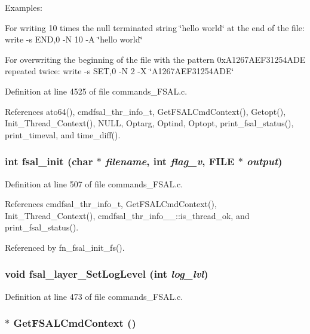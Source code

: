 Examples:

For writing 10 times the null terminated string \char`\"{}hello world\char`\"{} at the end of the file: write -s END,0 -N 10 -A \char`\"{}hello world\char`\"{}

For overwriting the beginning of the file with the pattern 0x\-A1267AEF31254ADE repeated twice: write -s SET,0 -N 2 -X \char`\"{}A1267AEF31254ADE\char`\"{} 

Definition at line 4525 of file commands\_\-FSAL.c.

References ato64(), cmdfsal\_\-thr\_\-info\_\-t, Get\-FSALCmd\-Context(), Getopt(), Init\_\-Thread\_\-Context(), NULL, Optarg, Optind, Optopt, print\_\-fsal\_\-status(), print\_\-timeval, and time\_\-diff().
\subsubsection{\setlength{\rightskip}{0pt plus 5cm}int fsal\_\-init (char $\ast$ {\em filename}, int {\em flag\_\-v}, FILE $\ast$ {\em output})}\label{commands__FSAL_8c_a16}




Definition at line 507 of file commands\_\-FSAL.c.

References cmdfsal\_\-thr\_\-info\_\-t, Get\-FSALCmd\-Context(), Init\_\-Thread\_\-Context(), cmdfsal\_\-thr\_\-info\_\-\_\-::is\_\-thread\_\-ok, and print\_\-fsal\_\-status().

Referenced by fn\_\-fsal\_\-init\_\-fs().
\subsubsection{\setlength{\rightskip}{0pt plus 5cm}void fsal\_\-layer\_\-Set\-Log\-Level (int {\em log\_\-lvl})}\label{commands__FSAL_8c_a14}




Definition at line 473 of file commands\_\-FSAL.c.
\subsubsection{$\ast$ Get\-FSALCmd\-Context ()}\label{commands__FSAL_8c_a12}


